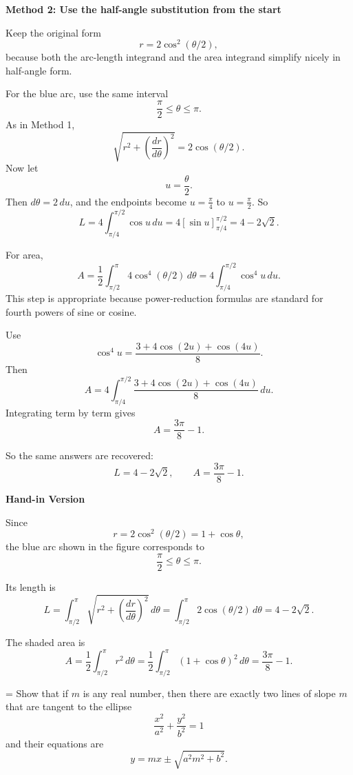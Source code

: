 \documentclass[a4paper,12pt,twocolumn]{article}
\newlength{\problemnumberwidth}
\newenvironment{solutionbox}{\begin{framed}}{\end{framed}}
\newcommand{\problem}[3]{%
  \Needspace{10\baselineskip}%
  \phantomsection\label{#1}%
  \par\vspace{0.8em}%
  \noindent
  \hangindent=\problemnumberwidth
  \hangafter=1
  \makebox[\problemnumberwidth][l]{\textbf{#2.}}#3\par
}
\begin{document}
\begin{solutionbox}
\textbf{Method 2: Use the half-angle substitution from the start}

\begin{steps}
\item Keep the original form
\[
r=2\cos^2(\theta/2),
\]
because both the arc-length integrand and the area integrand simplify nicely in half-angle form.

\item For the blue arc, use the same interval
\[
\frac{\pi}{2}\le\theta\le\pi.
\]
As in Method 1,
\[
\sqrt{r^2+\left(\frac{dr}{d\theta}\right)^2}=2\cos(\theta/2).
\]
Now let
\[
u=\frac{\theta}{2}.
\]
Then \(d\theta=2\,du\), and the endpoints become \(u=\frac{\pi}{4}\) to \(u=\frac{\pi}{2}\). So
\[
L=4\int_{\pi/4}^{\pi/2}\cos u\,du
=4\left[\sin u\right]_{\pi/4}^{\pi/2}
=4-2\sqrt2.
\]

\item For area,
\[
A=\frac12\int_{\pi/2}^{\pi}4\cos^4(\theta/2)\,d\theta
=4\int_{\pi/4}^{\pi/2}\cos^4 u\,du.
\]
This step is appropriate because power-reduction formulas are standard for fourth powers of sine or cosine.

\item Use
\[
\cos^4 u=\frac{3+4\cos(2u)+\cos(4u)}{8}.
\]
Then
\[
A=4\int_{\pi/4}^{\pi/2}\frac{3+4\cos(2u)+\cos(4u)}{8}\,du.
\]
Integrating term by term gives
\[
A=\frac{3\pi}{8}-1.
\]

\item So the same answers are recovered:
\[
\boxed{L=4-2\sqrt2},
\qquad
\boxed{A=\frac{3\pi}{8}-1}.
\]
\end{steps}
\end{solutionbox}

\begin{solutionbox}
\textbf{Hand-in Version}

Since
\[
r=2\cos^2(\theta/2)=1+\cos\theta,
\]
the blue arc shown in the figure corresponds to
\[
\frac{\pi}{2}\le\theta\le\pi.
\]

Its length is
\[
L=\int_{\pi/2}^{\pi}\sqrt{r^2+\left(\frac{dr}{d\theta}\right)^2}\,d\theta
=\int_{\pi/2}^{\pi}2\cos(\theta/2)\,d\theta
=\boxed{4-2\sqrt2}.
\]

The shaded area is
\[
A=\frac12\int_{\pi/2}^{\pi}r^2\,d\theta
=\frac12\int_{\pi/2}^{\pi}(1+\cos\theta)^2\,d\theta
=\boxed{\frac{3\pi}{8}-1}.
\]
\end{solutionbox}

\problem{prob:10-review-58}{58}{Show that if \(m\) is any real number, then there are exactly two lines of slope \(m\) that are tangent to the ellipse
\[
\frac{x^2}{a^2}+\frac{y^2}{b^2}=1
\]
and their equations are
\[
y=mx\pm\sqrt{a^2m^2+b^2}.
\]}
\end{document}
